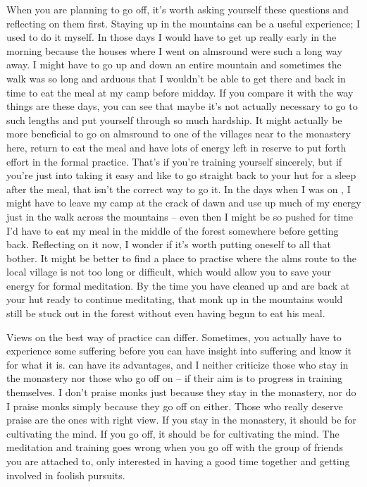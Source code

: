 When you are planning to go off, it's worth asking yourself these questions and reflecting on them first. Staying up in the mountains can be a useful experience; I used to do it myself. In those days I would have to get up really early in the morning because the houses where I went on almsround were such a long way away. I might have to go up and down an entire mountain and sometimes the walk was so long and arduous that I wouldn't be able to get there and back in time to eat the meal at my camp before midday. If you compare it with the way things are these days, you can see that maybe it's not actually necessary to go to such lengths and put yourself through so much hardship. It might actually be more beneficial to go on almsround to one of the villages near to the monastery here, return to eat the meal and have lots of energy left in reserve to put forth effort in the formal practice. That's if you're training yourself sincerely, but if you're just into taking it easy and like to go straight back to your hut for a sleep after the meal, that isn't the correct way to go it. In the days when I was on , I might have to leave my camp at the crack of dawn and use up much of my energy just in the walk across the mountains -- even then I might be so pushed for time I'd have to eat my meal in the middle of the forest somewhere before getting back. Reflecting on it now, I wonder if it's worth putting oneself to all that bother. It might be better to find a place to practise where the alms route to the local village is not too long or difficult, which would allow you to save your energy for formal meditation. By the time you have cleaned up and are back at your hut ready to continue meditating, that monk up in the mountains would still be stuck out in the forest without even having begun to eat his meal. 

Views on the best way of practice can differ. Sometimes, you actually have to experience some suffering before you can have insight into suffering and know it for what it is.  can have its advantages, and I neither criticize those who stay in the monastery nor those who go off on  -- if their aim is to progress in training themselves. I don't praise monks just because they stay in the monastery, nor do I praise monks simply because they go off on  either. Those who really deserve praise are the ones with right view. If you stay in the monastery, it should be for cultivating the mind. If you go off, it should be for cultivating the mind. The meditation and training goes wrong when you go off with the group of friends you are attached to, only interested in having a good time together and getting involved in foolish pursuits.
\vspace*{\baselineskip}

